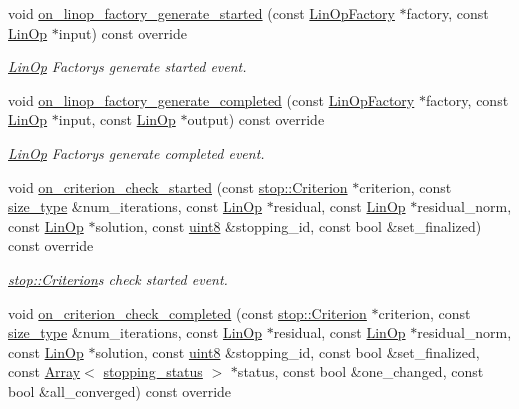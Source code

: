 \begin{DoxyCompactItemize}
void \hyperlink{classgko_1_1log_1_1Record_aed1c3d83b9749ff53546a001e3b387b0}{on\+\_\+linop\+\_\+factory\+\_\+generate\+\_\+started} (const \hyperlink{classgko_1_1LinOpFactory}{Lin\+Op\+Factory} $\ast$factory, const \hyperlink{classgko_1_1LinOp}{Lin\+Op} $\ast$input) const override
\begin{DoxyCompactList}\small\item\em \hyperlink{classgko_1_1LinOp}{Lin\+Op} Factory\textquotesingle{}s generate started event. \end{DoxyCompactList}\item 
void \hyperlink{classgko_1_1log_1_1Record_a6120652247f008878e0aba35479f2c14}{on\+\_\+linop\+\_\+factory\+\_\+generate\+\_\+completed} (const \hyperlink{classgko_1_1LinOpFactory}{Lin\+Op\+Factory} $\ast$factory, const \hyperlink{classgko_1_1LinOp}{Lin\+Op} $\ast$input, const \hyperlink{classgko_1_1LinOp}{Lin\+Op} $\ast$output) const override
\begin{DoxyCompactList}\small\item\em \hyperlink{classgko_1_1LinOp}{Lin\+Op} Factory\textquotesingle{}s generate completed event. \end{DoxyCompactList}\item 
void \hyperlink{classgko_1_1log_1_1Record_a895c10338a345d55f0264a1b4fc96073}{on\+\_\+criterion\+\_\+check\+\_\+started} (const \hyperlink{classgko_1_1stop_1_1Criterion}{stop\+::\+Criterion} $\ast$criterion, const \hyperlink{namespacegko_a6e5c95df0ae4e47aab2f604a22d98ee7}{size\+\_\+type} \&num\+\_\+iterations, const \hyperlink{classgko_1_1LinOp}{Lin\+Op} $\ast$residual, const \hyperlink{classgko_1_1LinOp}{Lin\+Op} $\ast$residual\+\_\+norm, const \hyperlink{classgko_1_1LinOp}{Lin\+Op} $\ast$solution, const \hyperlink{namespacegko_a3950fc3732811a8563484e5098c31531}{uint8} \&stopping\+\_\+id, const bool \&set\+\_\+finalized) const override
\begin{DoxyCompactList}\small\item\em \hyperlink{classgko_1_1stop_1_1Criterion}{stop\+::\+Criterion}\textquotesingle{}s check started event. \end{DoxyCompactList}\item 
void \hyperlink{classgko_1_1log_1_1Record_a5193e064d6541cde6b456d6d9d0f6162}{on\+\_\+criterion\+\_\+check\+\_\+completed} (const \hyperlink{classgko_1_1stop_1_1Criterion}{stop\+::\+Criterion} $\ast$criterion, const \hyperlink{namespacegko_a6e5c95df0ae4e47aab2f604a22d98ee7}{size\+\_\+type} \&num\+\_\+iterations, const \hyperlink{classgko_1_1LinOp}{Lin\+Op} $\ast$residual, const \hyperlink{classgko_1_1LinOp}{Lin\+Op} $\ast$residual\+\_\+norm, const \hyperlink{classgko_1_1LinOp}{Lin\+Op} $\ast$solution, const \hyperlink{namespacegko_a3950fc3732811a8563484e5098c31531}{uint8} \&stopping\+\_\+id, const bool \&set\+\_\+finalized, const \hyperlink{classgko_1_1Array}{Array}$<$ \hyperlink{classgko_1_1stopping__status}{stopping\+\_\+status} $>$ $\ast$status, const bool \&one\+\_\+changed, const bool \&all\+\_\+converged) const override

\end{DoxyCompactItemize}
